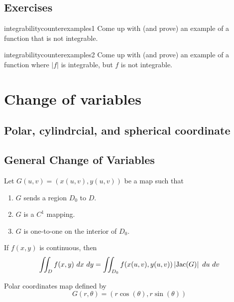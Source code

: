 \subsection{Exercises}

\begin{problem}{integrabilitycounterexamples1}
Come up with (and prove) an example of a function that is not integrable.
\end{problem}

\begin{problem}{integrabilitycounterexamples2}
Come up with (and prove) an example of a function where $|f|$ is integrable, but $f$ is not integrable.
\end{problem}

\section{Change of variables}

\subsection{Polar, cylindrcial, and spherical coordinate}

\subsection{General Change of Variables}





\begin{theorem}
    Let  $G(u,v) = \left(x(u,v), y(u,v)\right)$ be a map such that
    
    \begin{enumerate}
        \item $G$ sends a region $D_0$ to $D$.  
        \item $G$ is a $C^1$ mapping.
        \item $G$ is one-to-one on the interior of $D_0$.  
    \end{enumerate}

    
    If $f(x,y)$ is continuous, then
    $$\iint_D f(x,y) \ dx \ dy = \iint_{D_0} f(x(u,v), y(u,v)) \left|\textnormal{Jac}(G)\right| \ du \ dv$$
    
\end{theorem}

\begin{example}
    Polar coordinates map defined by $$G(r,\theta) = (r\cos(\theta), r\sin(\theta))$$
\end{example}


